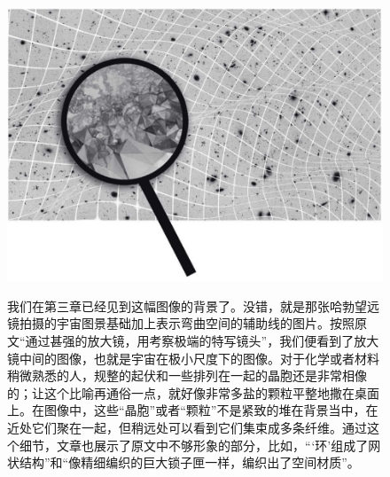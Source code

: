 \begin{figure}[htbp]
\begin{minipage}[t]{0.3\linewidth}
\centering
\bc
\includegraphics[width=3\textwidth]{img/51.png}\\[12pt]
\ec
\caption{我们在第三章已经见到这幅图像的背景了。没错，就是那张哈勃望远镜拍摄的宇宙图景基础加上表示弯曲空间的辅助线的图片。按照原文“通过甚强的放大镜，用考察极端的特写镜头”，我们便看到了放大镜中间的图像，也就是宇宙在极小尺度下的图像。对于化学或者材料稍微熟悉的人，规整的起伏和一些排列在一起的晶胞还是非常相像的；让这个比喻再通俗一点，就好像非常多盐的颗粒平整地撒在桌面上。在图像中，这些“晶胞”或者“颗粒”不是紧致的堆在背景当中，在近处它们聚在一起，但稍远处可以看到它们集束成多条纤维。通过这个细节，文章也展示了原文中不够形象的部分，比如，“‘环’组成了网状结构”和“像精细编织的巨大锁子匣一样，编织出了空间材质”。}
\label{fig:side:a}
\end{minipage}

\end{figure} 


